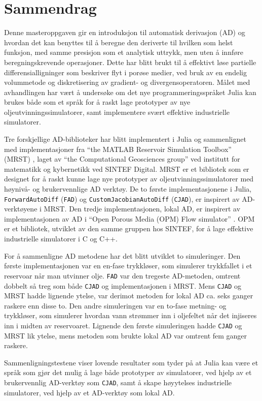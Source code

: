 \chapter*{Sammendrag}
Denne masteroppgaven gir en introduksjon til automatisk derivasjon (AD) og hvordan det kan benyttes til å beregne den deriverte til hvilken som helst funksjon, med samme presisjon som et analytisk uttrykk, men uten å innføre beregningskrevende operasjoner. Dette har blitt brukt til å effektivt løse partielle differensialligninger som beskriver flyt i porøse medier, ved bruk av en endelig volummetode og diskretisering av gradient- og divergensoperatoren. Målet med avhandlingen har vært å undersøke om det nye programmeringsspråket Julia kan brukes både som et språk for å raskt lage prototyper av nye oljeutvinningssimulatorer, samt implementere svært effektive industrielle simulatorer.

Tre forskjellige AD-biblioteker har blitt implementert i Julia og sammenlignet med implementasjoner fra \enquote{the MATLAB Reservoir Simulation Toolbox} (MRST) \emph{\citep{mrstHomepage}}, laget av \enquote{the Computational Geosciences group} ved institutt for matematikk og kybernetikk ved SINTEF Digital. MRST er et bibliotek som er designet for å raskt kunne lage nye prototyper av oljeutvinningssimulatorer med høynivå- og brukervennlige AD verktøy. De to første implementasjonene i Julia, \texttt{ForwardAutoDiff} (\texttt{FAD}) og \texttt{CustomJacobianAutoDiff} (\texttt{CJAD}), er inspirert av AD-verktøyene i MRST. Den tredje implementasjonen, lokal AD, er inspirert av implementasjonen av AD i \enquote{Open Porous Media (OPM) Flow simulator} \emph{\citep{opm}}. OPM er et bibliotek, utviklet av den samme gruppen hos SINTEF, for å lage effektive industrielle simulatorer i C og C++.

For å sammenligne AD metodene har det blitt utviklet to simuleringer. Den første implementasjonen var en en-fase trykkløser, som simulerer trykkfallet i et reservoar når man utvinner olje. \texttt{FAD} var den tregeste AD-metoden, omtrent dobbelt så treg som både \texttt{CJAD} og implementasjonen i MRST. Mens \texttt{CJAD} og MRST hadde lignende ytelse, var derimot metoden for lokal AD ca. seks ganger raskere enn disse to. Den andre simuleringen var en to-fase metning- og trykkløser, som simulerer hvordan vann strømmer inn i oljefeltet når det injiseres inn i midten av reservoaret. Lignende den første simuleringen hadde \texttt{CJAD} og MRST lik ytelse, mens metoden som brukte lokal AD var omtrent fem ganger raskere.

Sammenligningstestene viser lovende resultater som tyder på at Julia kan være et språk som gjør det mulig å lage både prototyper av simulatorer, ved hjelp av et brukervennlig AD-verktøy som \texttt{CJAD}, samt å skape høyytelses industrielle simulatorer, ved hjelp av et AD-verktøy som lokal AD.